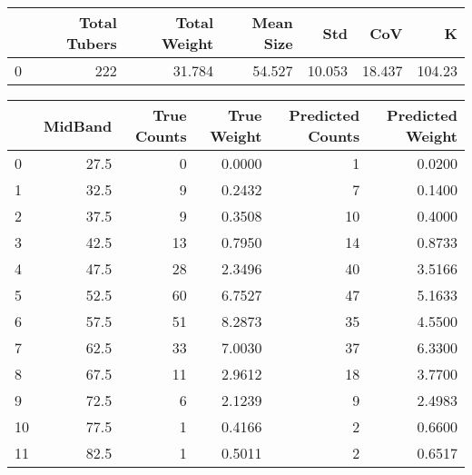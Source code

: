 \begin{tabular}{lrrrrrr}
\toprule
{} &  Total Tubers &  Total Weight &  Mean Size &     Std &     CoV &       K \\
\midrule
0 &           222 &        31.784 &     54.527 &  10.053 &  18.437 &  104.23 \\
\bottomrule
\end{tabular}

\begin{tabular}{lrrrrr}
\toprule
{} &  MidBand &  True Counts &  True Weight &  Predicted Counts &  Predicted Weight \\
\midrule
0  &     27.5 &            0 &       0.0000 &                 1 &            0.0200 \\
1  &     32.5 &            9 &       0.2432 &                 7 &            0.1400 \\
2  &     37.5 &            9 &       0.3508 &                10 &            0.4000 \\
3  &     42.5 &           13 &       0.7950 &                14 &            0.8733 \\
4  &     47.5 &           28 &       2.3496 &                40 &            3.5166 \\
5  &     52.5 &           60 &       6.7527 &                47 &            5.1633 \\
6  &     57.5 &           51 &       8.2873 &                35 &            4.5500 \\
7  &     62.5 &           33 &       7.0030 &                37 &            6.3300 \\
8  &     67.5 &           11 &       2.9612 &                18 &            3.7700 \\
9  &     72.5 &            6 &       2.1239 &                 9 &            2.4983 \\
10 &     77.5 &            1 &       0.4166 &                 2 &            0.6600 \\
11 &     82.5 &            1 &       0.5011 &                 2 &            0.6517 \\
\bottomrule
\end{tabular}

